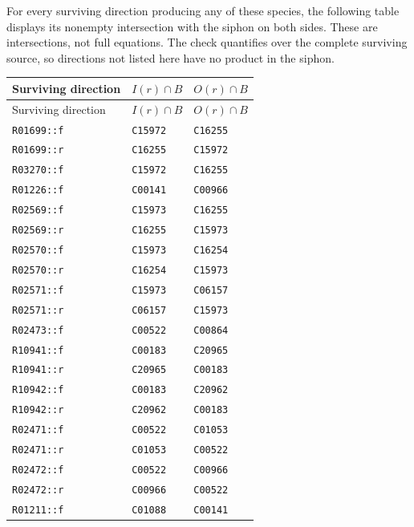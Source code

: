 \documentclass[10pt]{article}
\begin{document}
For every surviving direction producing any of these species, the following table displays its nonempty intersection with the siphon on both sides. These are intersections, not full equations. The check quantifies over the complete surviving source, so directions not listed here have no product in the siphon.
\begin{longtable}{>{\raggedright\arraybackslash}p{.26\linewidth}>{\raggedright\arraybackslash}p{.30\linewidth}>{\raggedright\arraybackslash}p{.32\linewidth}}
\toprule Surviving direction & $I(r)\cap B$ & $O(r)\cap B$\\\midrule
\endfirsthead\toprule Surviving direction & $I(r)\cap B$ & $O(r)\cap B$\\\midrule
\endhead
\texttt{R01699::f} & \texttt{C15972} & \texttt{C16255}\\
\texttt{R01699::r} & \texttt{C16255} & \texttt{C15972}\\
\texttt{R03270::f} & \texttt{C15972} & \texttt{C16255}\\
\texttt{R01226::f} & \texttt{C00141} & \texttt{C00966}\\
\texttt{R02569::f} & \texttt{C15973} & \texttt{C16255}\\
\texttt{R02569::r} & \texttt{C16255} & \texttt{C15973}\\
\texttt{R02570::f} & \texttt{C15973} & \texttt{C16254}\\
\texttt{R02570::r} & \texttt{C16254} & \texttt{C15973}\\
\texttt{R02571::f} & \texttt{C15973} & \texttt{C06157}\\
\texttt{R02571::r} & \texttt{C06157} & \texttt{C15973}\\
\texttt{R02473::f} & \texttt{C00522} & \texttt{C00864}\\
\texttt{R10941::f} & \texttt{C00183} & \texttt{C20965}\\
\texttt{R10941::r} & \texttt{C20965} & \texttt{C00183}\\
\texttt{R10942::f} & \texttt{C00183} & \texttt{C20962}\\
\texttt{R10942::r} & \texttt{C20962} & \texttt{C00183}\\
\texttt{R02471::f} & \texttt{C00522} & \texttt{C01053}\\
\texttt{R02471::r} & \texttt{C01053} & \texttt{C00522}\\
\texttt{R02472::f} & \texttt{C00522} & \texttt{C00966}\\
\texttt{R02472::r} & \texttt{C00966} & \texttt{C00522}\\
\texttt{R01211::f} & \texttt{C01088} & \texttt{C00141}\\

\end{longtable}
\end{document}
